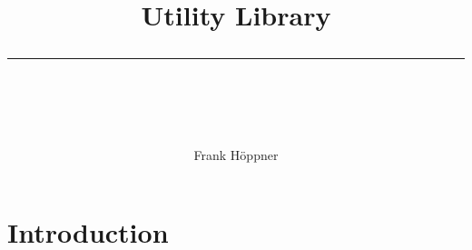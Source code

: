 \documentclass[a4paper]{book}
\begin{document}
\thispagestyle{empty}
\title{Utility Library\\[-3mm]
\rule{12cm}{1mm}\\[1cm]}
\author{Frank H\"oppner}
\maketitle

\clearemptydoublepage
{}
\tableofcontents
\clearemptydoublepage
{}
\chapter{Introduction}

%
%
%
\end{document}
